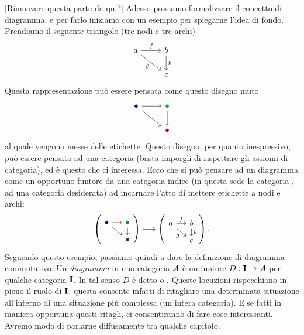 \begin{costruzione}\label{costruzione:DiagsAreFunctors}
{\color{red} [Rimuovere questa parte da qui?]}
Adesso possiamo formalizzare il concetto di diagramma, e per farlo iniziamo con un esempio per spiegarne l'idea di fondo. Prendiamo il seguente triangolo (tre nodi e tre archi)
\[\begin{tikzcd}
a \ar["f",r] \ar["g",dr,swap] & b \ar["h",d] \\
                              & c
\end{tikzcd}\]
Questa rappresentazione può essere pensata come questo disegno muto
\[\begin{tikzcd}
	\colbullet[blue] \ar[r] \ar[dr] & \colbullet[green] \ar[d] \\
	                                & \colbullet[red]
\end{tikzcd}\]
al quale vengono messe delle etichette. Questo disegno, per quanto inespressivo, può essere pensato ad una categoria (basta imporgli di rispettare gli assiomi di categoria), ed è questo che ci interessa. Ecco che si può pensare ad un diagramma come un opportuno funtore da una categoria indice (in questa sede la categoria , ad una categoria desiderata) ad incarnare l'atto di mettere etichette a nodi e archi:
\[\left(\begin{tikzcd}[sep=small]
\colbullet[blue] \ar[r] \ar[dr] & \colbullet[green] \ar[d] \\
	                            & \colbullet[red]
\end{tikzcd}\right) \longrightarrow
\left(\begin{tikzcd}[sep=small]
a \ar["f",r] \ar["g",dr,swap] & b \ar["h",d] \\
	                          & c
\end{tikzcd}\right).\]
Seguendo questo esempio, passiamo quindi a dare la definizione di diagramma commutativo.\newline
Un {\em diagramma} in una categoria \(\mathcal A\) è un funtore \(D : \mathbf I \to \mathcal A\) per qualche categoria \(\mathbf I\). In tal senso \(D\) è detto  o . Queste locuzioni rispecchiano in pieno il ruolo di \(\mathbf I\): questa consente infatti di ritagliare una determinata situazione all'interno di una situazione più complessa (un intera categoria). E se fatti in maniera opportuna questi ritagli, ci consentiranno di fare cose interessanti. Avremo modo di parlarne diffusamente tra qualche capitolo.
\end{costruzione}


